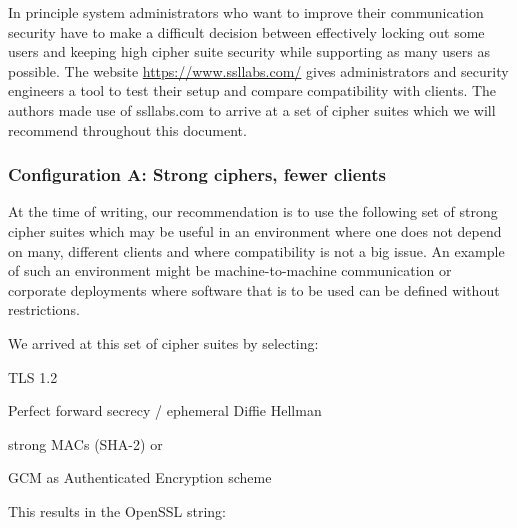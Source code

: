 
In principle system administrators who want to improve their communication security
have to make a difficult decision between effectively locking out some users and 
keeping high cipher suite security while supporting as many users as possible.
The website \url{https://www.ssllabs.com/} gives administrators and security engineers
a tool to test their setup and compare compatibility with clients. The authors made 
use of ssllabs.com to arrive at a set of cipher suites which we will recommend 
throughout this document.



\subsubsection{Configuration A: Strong ciphers, fewer clients}

At the time of writing, our recommendation is to use the following set of strong cipher
suites which may be useful in an environment where one does not depend on many,
different clients and where compatibility is not a big issue.  An example
of such an environment might be machine-to-machine communication or corporate
deployments where software that is to be used can be defined without restrictions.


We arrived at this set of cipher suites by selecting:

\begin{itemize*}
  \item TLS 1.2
  \item Perfect forward secrecy / ephemeral Diffie Hellman
  \item strong MACs (SHA-2) or
  \item GCM as Authenticated Encryption scheme
\end{itemize*}

This results in the OpenSSL string:

%



